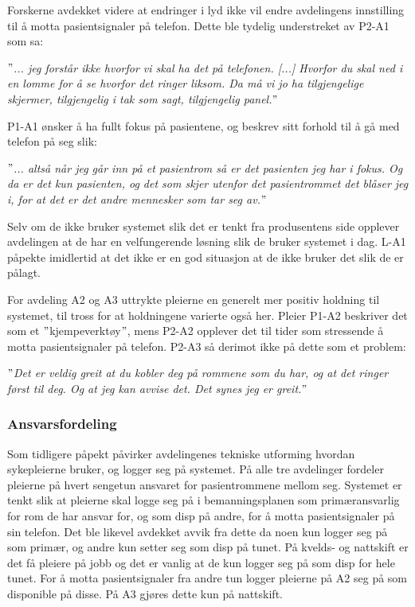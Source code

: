 \noindent
Forskerne avdekket videre at endringer i lyd ikke vil endre avdelingens innstilling til å motta pasientsignaler på telefon. Dette ble tydelig understreket av P2-A1 som sa:

\noindent
\textit{$"$... jeg forstår ikke hvorfor vi skal ha det på telefonen. [...] Hvorfor du skal ned i en lomme for å se hvorfor det ringer liksom. Da må vi jo ha tilgjengelige skjermer, tilgjengelig i tak som sagt, tilgjengelig panel.$"$}

\noindent
P1-A1 ønsker å ha fullt fokus på pasientene, og beskrev sitt forhold til å gå med telefon på seg slik:

\noindent
\textit{$"$... altså når jeg går inn på et pasientrom så er det pasienten jeg har i fokus. Og da er det kun pasienten, og det som skjer utenfor det pasientrommet det blåser jeg i, for at det er det andre mennesker som tar seg av.$"$}

\noindent
Selv om de ikke bruker systemet slik det er tenkt fra produsentens side opplever avdelingen at de har en velfungerende løsning slik de bruker systemet i dag. L-A1 påpekte imidlertid at det ikke er en god situasjon at de ikke bruker det slik de er pålagt.

\noindent
For avdeling A2 og A3 uttrykte pleierne en generelt mer positiv holdning til systemet, til tross for at holdningene varierte også her. Pleier P1-A2 beskriver det som et $"$kjempeverktøy$"$, mens P2-A2 opplever det til tider som stressende å motta pasientsignaler på telefon. P2-A3 så derimot ikke på dette som et problem: 

\noindent
\textit{$"$Det er veldig greit at du kobler deg på rommene som du har, og at det ringer først til deg. Og at jeg kan avvise det. Det synes jeg er greit.$"$}

\subsubsection{Ansvarsfordeling}
Som tidligere påpekt påvirker avdelingenes tekniske utforming hvordan sykepleierne bruker, og logger seg på systemet. På alle tre avdelinger fordeler pleierne på hvert sengetun ansvaret for pasientrommene mellom seg. Systemet er tenkt slik at pleierne skal logge seg på i bemanningsplanen som primæransvarlig for rom de har ansvar for, og som disp på andre, for å motta pasientsignaler på sin telefon. Det ble likevel avdekket avvik fra dette da noen kun logger seg på som primær, og andre kun setter seg som disp på tunet. På kvelds- og nattskift er det få pleiere på jobb og det er vanlig at de kun logger seg på som disp for hele tunet. For å motta pasientsignaler fra andre tun logger pleierne på A2 seg på som disponible på disse. På A3 gjøres dette kun på nattskift. 

